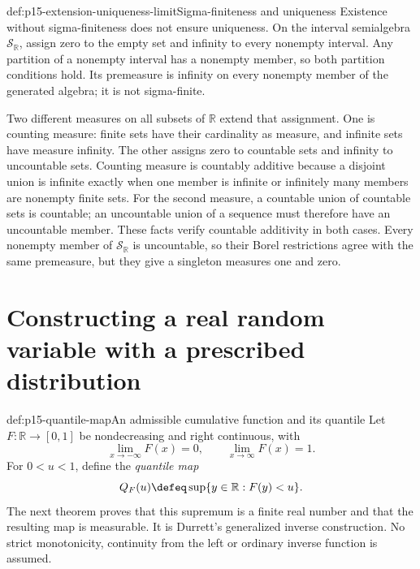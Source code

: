 \begin{hbwarning}{def:p15-extension-uniqueness-limit}{Sigma-finiteness and uniqueness}
Existence without sigma-finiteness does not ensure uniqueness. On the
interval semialgebra \(\mathcal S_{\mathbb R}\), assign zero to the
empty set and infinity to every nonempty interval. Any partition of a
nonempty interval has a nonempty member, so both partition conditions
hold. Its premeasure is infinity on every nonempty member of the generated
algebra; it is not sigma-finite.

Two different measures on all subsets of \(\mathbb R\) extend that
assignment. One is counting measure: finite sets have their cardinality
as measure, and infinite sets have measure infinity. The other assigns
zero to countable sets and infinity to uncountable sets. Counting measure
is countably additive because a disjoint union is infinite exactly when
one member is infinite or infinitely many members are nonempty finite
sets. For the second measure, a countable union of countable sets is
countable; an uncountable union of a sequence must therefore have an
uncountable member. These facts verify countable additivity in both cases.
Every nonempty member of \(\mathcal S_{\mathbb R}\) is uncountable,
so their Borel restrictions agree with the same premeasure, but they give
a singleton measures one and zero.
\end{hbwarning}

\section{Constructing a real random variable with a prescribed distribution}
\label{sec:p15-distribution-existence}

\begin{hbdefinition}{def:p15-quantile-map}{An admissible cumulative function and its quantile}
Let \(F:\mathbb R\to[0,1]\) be nondecreasing and right continuous,
with
\[
 \lim_{x\to-\infty}F(x)=0,\qquad
 \lim_{x\to\infty}F(x)=1.
\]
For \(0<u<1\), define the \emph{quantile map}
\[
 Q_F(u)\defeq\sup\{y\in\mathbb R:F(y)<u\}.
\]
The next theorem proves that this supremum is a finite real number and
that the resulting map is measurable. It is Durrett's generalized inverse
construction. No strict monotonicity, continuity from the left or ordinary
inverse function is assumed.
\end{hbdefinition}

